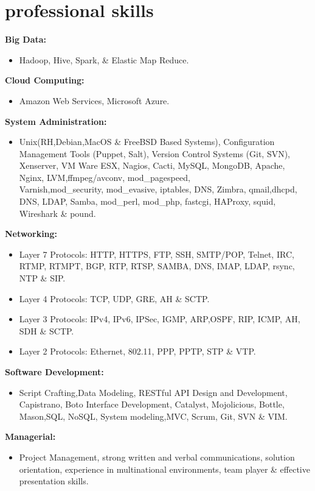 \documentclass[]{friggeri-cv} %
\begin{document}
\section{professional skills}
{\large \textbf{Big Data:}}
\begin{itemize}
\item Hadoop, Hive, Spark, \& Elastic Map Reduce.   
\end{itemize}
{\large \textbf{Cloud Computing:}}
\begin{itemize}
\item Amazon Web Services, Microsoft Azure.   
\end{itemize}
{\large \textbf{System Administration:}}
\begin{itemize}
\item Unix(RH,Debian,MacOS \& FreeBSD Based Systems), Configuration Management Tools (Puppet, Salt), Version Control Systems (Git, SVN), Xenserver, VM Ware ESX, Nagios, Cacti, MySQL, MongoDB, Apache, Nginx, LVM,ffmpeg/avconv, mod\_pagespeed, \\ 
Varnish,mod\_security, mod\_evasive, iptables, DNS, Zimbra, qmail,dhcpd, DNS, LDAP, Samba, mod\_perl, mod\_php, fastcgi, HAProxy, squid, Wireshark \& pound.  
\end{itemize}
{\large \textbf{Networking:}}
\begin{itemize}
\item Layer 7 Protocols: HTTP, HTTPS, FTP, SSH, SMTP/POP, Telnet, IRC, RTMP, RTMPT, BGP, RTP, RTSP, SAMBA, DNS, IMAP, LDAP, rsync, NTP \& SIP. 
\item Layer 4 Protocols: TCP, UDP, GRE, AH \& SCTP.
\item Layer 3 Protocols: IPv4, IPv6, IPSec, IGMP, ARP,OSPF, RIP, ICMP, AH, SDH \& SCTP.
\item Layer 2 Protocols: Ethernet, 802.11, PPP, PPTP, STP \& VTP.
\end{itemize}
{\large \textbf{Software Development:}}
\begin{itemize}
\item Script Crafting,Data Modeling, RESTful API Design and Development, Capistrano, Boto Interface Development, Catalyst, Mojolicious, Bottle, Mason,SQL, NoSQL, System modeling,MVC, Scrum, Git, SVN \& VIM.
\end{itemize}
{\large \textbf{Managerial:}}
\begin{itemize}
\item Project Management, strong written and verbal communications, solution orientation, experience in multinational environments, team player  \& effective presentation skills. 
\end{itemize}
\end{document}
